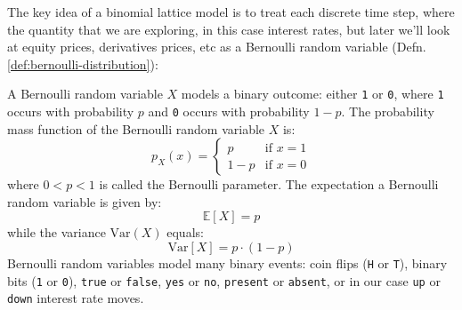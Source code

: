 \documentclass[11pt]{article}
\theoremstyle{definition}
\begin{document}
The key idea of a binomial lattice model is to treat each discrete time step, where the quantity that we are 
exploring, in this case interest rates, but later we'll look at equity prices, derivatives prices, etc 
as a Bernoulli random variable (Defn. \ref{def:bernoulli-distribution}):
\begin{definition}\label{def:bernoulli-distribution}
A Bernoulli random variable $X$ models a binary outcome: either \texttt{1} or \texttt{0}, 
where \texttt{1} occurs with probability $p$ and \texttt{0} occurs with probability $1-p$. 
The probability mass function of the Bernoulli random variable $X$ is:	
\begin{equation}
p_{X}(x) = \begin{cases}
	p & \text{if } x = 1 \\
	1 - p & \text{if } x = 0
	\end{cases}
\end{equation}
where $0<p<1$ is called the Bernoulli parameter. The expectation a Bernoulli random variable is given by:
\begin{equation}
	\mathbb{E}\left[X\right] = p
\end{equation}
while the variance $\text{Var}(X)$ equals:
\begin{equation}
\text{Var}\left[X\right] = p\cdot(1-p)
\end{equation}
Bernoulli random variables model many binary events: coin flips (\texttt{H} or \texttt{T}), 
binary bits (\texttt{1} or \texttt{0}), \texttt{true} or \texttt{false}, \texttt{yes} or \texttt{no}, \texttt{present} or \texttt{absent}, 
or in our case \texttt{up} or \texttt{down} interest rate moves.
\end{definition}
\end{document}
